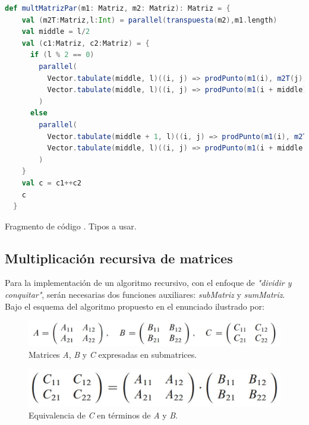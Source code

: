 \documentclass{article}
\newcounter{codesnippet}
\newcommand{\newcodesnippet}{%
  \stepcounter{codesnippet}%
}
\begin{document}
\newcodesnippet
\begin{lstlisting}[language=Scala]
  def multMatrizPar(m1: Matriz, m2: Matriz): Matriz = {
    val (m2T:Matriz,l:Int) = parallel(transpuesta(m2),m1.length)
    val middle = l/2
    val (c1:Matriz, c2:Matriz) = {
      if (l % 2 == 0)
        parallel(
          Vector.tabulate(middle, l)((i, j) => prodPunto(m1(i), m2T(j))),
          Vector.tabulate(middle, l)((i, j) => prodPunto(m1(i + middle), m2T(j)))
        )
      else
        parallel(
          Vector.tabulate(middle + 1, l)((i, j) => prodPunto(m1(i), m2T(j))),
          Vector.tabulate(middle, l)((i, j) => prodPunto(m1(i + middle + 1), m2T(j)))
        )
    }
    val c = c1++c2
    c
  }
\end{lstlisting}
\begin{center}
    \small{Fragmento de código \thecodesnippet. Tipos a usar.}
\end{center}
\subsection{Multiplicación recursiva de matrices}

Para la implementación de un algoritmo recursivo, con el enfoque de \textit{"dividir y conquitar"}, serán necesarias dos funciones auxiliares: \textit{subMatriz} y \textit{sumMatriz}. Bajo el esquema del algoritmo propuesto en el enunciado ilustrado por:

\begin{figure}[h]
    \begin{minipage}{1\textwidth}
        \centering
        \includegraphics[scale=0.3]{Imagen1.png}
        \caption{Matrices \textit{A}, \textit{B} y \textit{C} expresadas en submatrices.}
        \label{1}
    \end{minipage}
\end{figure}

\begin{figure}[h]
    \begin{minipage}{1\textwidth}
        \centering
        \includegraphics[scale=0.25]{Imagen2.png}
        \caption{Equivalencia de \textit{C} en términos de \textit{A} y \textit{B}.}
        \label{1}
    \end{minipage}
\end{figure}
\end{document}
